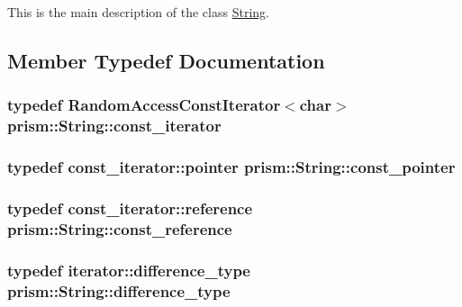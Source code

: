 This is the main description of the class \hyperlink{classprism_1_1_string}{String}. 

\subsection{Member Typedef Documentation}
\subsubsection[{\texorpdfstring{const\+\_\+iterator}{const_iterator}}]{\setlength{\rightskip}{0pt plus 5cm}typedef Random\+Access\+Const\+Iterator$<$char$>$ {\bf prism\+::\+String\+::const\+\_\+iterator}}\hypertarget{classprism_1_1_string_a8b46f0fbe9c5c94ba892975242e3ab68}{}\label{classprism_1_1_string_a8b46f0fbe9c5c94ba892975242e3ab68}
\subsubsection[{\texorpdfstring{const\+\_\+pointer}{const_pointer}}]{\setlength{\rightskip}{0pt plus 5cm}typedef const\+\_\+iterator\+::pointer {\bf prism\+::\+String\+::const\+\_\+pointer}}\hypertarget{classprism_1_1_string_adbea4cbf0f4f62948eb2accf7d402456}{}\label{classprism_1_1_string_adbea4cbf0f4f62948eb2accf7d402456}
\subsubsection[{\texorpdfstring{const\+\_\+reference}{const_reference}}]{\setlength{\rightskip}{0pt plus 5cm}typedef const\+\_\+iterator\+::reference {\bf prism\+::\+String\+::const\+\_\+reference}}\hypertarget{classprism_1_1_string_a7825c62cb2047e36ec704a17ef94f299}{}\label{classprism_1_1_string_a7825c62cb2047e36ec704a17ef94f299}
\subsubsection[{\texorpdfstring{difference\+\_\+type}{difference_type}}]{\setlength{\rightskip}{0pt plus 5cm}typedef iterator\+::difference\+\_\+type {\bf prism\+::\+String\+::difference\+\_\+type}}\hypertarget{classprism_1_1_string_a50fc3d423db1d24c511b28b24e4a7c00}{}\label{classprism_1_1_string_a50fc3d423db1d24c511b28b24e4a7c00}
